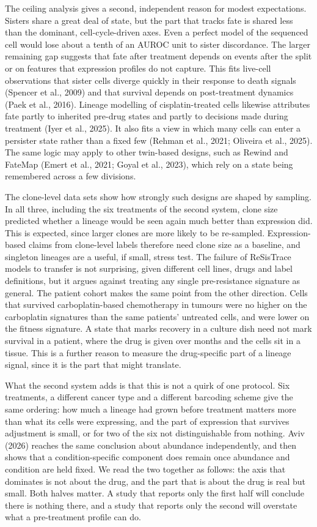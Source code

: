 \documentclass[11pt,a4paper]{article}
\begin{document}
The ceiling analysis gives a second, independent reason for modest expectations. Sisters share a great deal of state, but the part that tracks fate is shared less than the dominant, cell-cycle-driven axes. Even a perfect model of the sequenced cell would lose about a tenth of an AUROC unit to sister discordance. The larger remaining gap suggests that fate after treatment depends on events after the split or on features that expression profiles do not capture. This fits live-cell observations that sister cells diverge quickly in their response to death signals (Spencer et al., 2009) and that survival depends on post-treatment dynamics (Paek et al., 2016). Lineage modelling of cisplatin-treated cells likewise attributes fate partly to inherited pre-drug states and partly to decisions made during treatment (Iyer et al., 2025). It also fits a view in which many cells can enter a persister state rather than a fixed few (Rehman et al., 2021; Oliveira et al., 2025). The same logic may apply to other twin-based designs, such as Rewind and FateMap (Emert et al., 2021; Goyal et al., 2023), which rely on a state being remembered across a few divisions.

The clone-level data sets show how strongly such designs are shaped by sampling. In all three, including the six treatments of the second system, clone size predicted whether a lineage would be seen again much better than expression did. This is expected, since larger clones are more likely to be re-sampled. Expression-based claims from clone-level labels therefore need clone size as a baseline, and singleton lineages are a useful, if small, stress test. The failure of ReSisTrace models to transfer is not surprising, given different cell lines, drugs and label definitions, but it argues against treating any single pre-resistance signature as general. The patient cohort makes the same point from the other direction. Cells that survived carboplatin-based chemotherapy in tumours were no higher on the carboplatin signatures than the same patients' untreated cells, and were lower on the fitness signature. A state that marks recovery in a culture dish need not mark survival in a patient, where the drug is given over months and the cells sit in a tissue. This is a further reason to measure the drug-specific part of a lineage signal, since it is the part that might translate.

What the second system adds is that this is not a quirk of one protocol. Six treatments, a different cancer type and a different barcoding scheme give the same ordering: how much a lineage had grown before treatment matters more than what its cells were expressing, and the part of expression that survives adjustment is small, or for two of the six not distinguishable from nothing. Aviv (2026) reaches the same conclusion about abundance independently, and then shows that a condition-specific component does remain once abundance and condition are held fixed. We read the two together as follows: the axis that dominates is not about the drug, and the part that is about the drug is real but small. Both halves matter. A study that reports only the first half will conclude there is nothing there, and a study that reports only the second will overstate what a pre-treatment profile can do.
\end{document}
